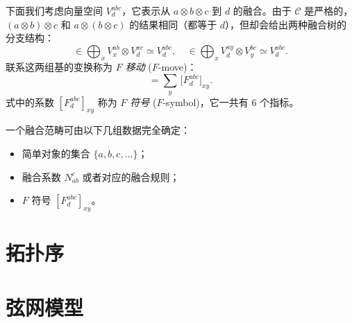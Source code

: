 下面我们考虑向量空间 $V^{abc}_d$，它表示从 $a\otimes b\otimes c$ 到 $d$ 的融合。由于 $\mathcal{C}$ 是严格的，$(a\otimes b)\otimes c$ 和 $a\otimes(b\otimes c)$ 的结果相同（都等于 $d$），但却会给出两种融合树的分支结构：
\begin{equation}
  
  \in \bigoplus_x V^{ab}_x \otimes V^{xc}_d \simeq V^{abc}_d, \quad
  
  \in \bigoplus_x V^{ay}_d \otimes V^{bc}_y \simeq V^{abc}_d.
\end{equation}
联系这两组基的变换称为 \emph{$F$ 移动} ($F$-move)：
\begin{equation}
  
  = \sum_y \, \bigl[ F^{abc}_d \bigr]_{xy}
  .
\end{equation}
式中的系数 $[F^{abc}_d]_{xy}$ 称为 \emph{$F$ 符号} ($F$-symbol)，它一共有 6 个指标。

一个融合范畴可由以下几组数据完全确定：

\begin{itemize}
  \item 简单对象的集合 $\{a,b,c,\ldots\}$；
  \item 融合系数 $N_{ab}^c$ 或者对应的融合规则；
  \item $F$ 符号 $[F^{abc}_d]_{xy}$。
\end{itemize}

\section{拓扑序}

\section{弦网模型}
